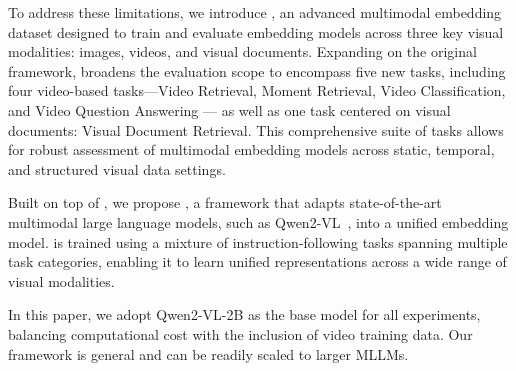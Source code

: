
To address these limitations, we introduce \benchmark, an advanced multimodal embedding dataset designed to train and evaluate embedding models across three key visual modalities: images, videos, and visual documents. Expanding on the original \mmeb~\citep{vlm2vec} framework, \benchmark broadens the evaluation scope to encompass five new tasks, including four video-based tasks—Video Retrieval, Moment Retrieval, Video Classification, and Video Question Answering — as well as one task centered on visual documents: Visual Document Retrieval. This comprehensive suite of tasks allows for robust assessment of multimodal embedding models across static, temporal, and structured visual data settings.

Built on top of \benchmark, we propose \textbf{\model}, a framework that adapts state-of-the-art multimodal large language models, such as Qwen2-VL~\citep{qwen2vl}, into a unified embedding model. \model is trained using a mixture of instruction-following tasks spanning multiple task categories, enabling it to learn unified representations across a wide range of visual modalities.

In this paper, we adopt Qwen2-VL-2B as the base model for all experiments, balancing computational cost with the inclusion of video training data. Our framework is general and can be readily scaled to larger MLLMs.






